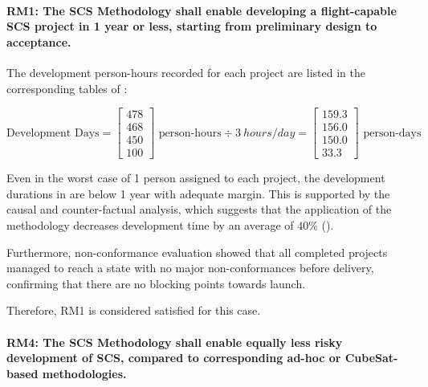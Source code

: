 \documentclass[a4paper,nobib,justified,final]{tufte-book}
\begin{document}
\paragraph{RM1: The SCS Methodology shall enable developing a flight-capable SCS project in 1 year or less, starting from preliminary design to acceptance.}

The development person-hours recorded for each project are listed in the corresponding tables of :
\begin{fullwidth}
\begin{equation}
\text{Development Days} = \left[\begin{matrix}
	478 \\ 468 \\ 450 \\ 100
\end{matrix}\right] \text{ person-hours} \div \qty{3}{hours/day} = \left[\begin{matrix}
	159.3 \\ 156.0 \\ 150.0 \\ 33.3
\end{matrix}
\right] \text{ person-days}
\label{eq:totalpersondays}
\end{equation}
\end{fullwidth}

Even in the worst case of 1 person assigned to each project, the development durations in  are below 1 year with adequate margin. This is supported by the causal and counter-factual analysis, which suggests that the application of the methodology decreases development time by an average of \(40\%\) ().

Furthermore, non-conformance evaluation showed that all completed projects managed to reach a state with no major non-conformances before delivery, confirming that there are no blocking points towards launch.

Therefore, RM1 is considered satisfied for this case.

\paragraph{RM4: The SCS Methodology shall enable equally less risky development of SCS, compared to corresponding ad-hoc or CubeSat-based methodologies.}
\end{document}
